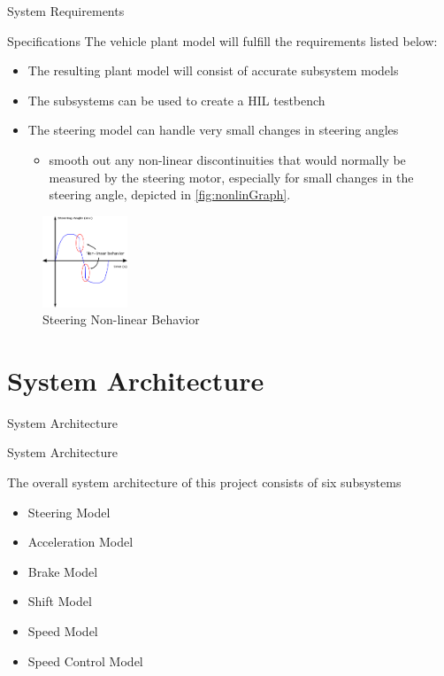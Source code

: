 \documentclass{beamer}
\begin{document}
\begin{frame}{System Requirements}
  \begin{block}{Specifications}
    The vehicle plant model will fulfill the requirements listed below:
\begin{itemize}
    \item The resulting plant model will consist of accurate subsystem models
    \item The subsystems can be used to create a HIL testbench
    \item The steering model can handle very small changes in steering angles
    \begin{itemize}
    		\item smooth out any non-linear discontinuities that would normally be measured by the steering motor, especially for small changes in the steering angle, depicted in \autoref{fig:nonlinGraph}.
    \end{itemize}
\end{itemize}
\begin{figure}[h]
    \centering
    \captionsetup{justification=centering, margin=3cm}
    \includegraphics[width=1in]{figs/inkscape/nonlinearBehavior}
    \caption{Steering Non-linear Behavior}
    \label{fig:nonlinGraph}
\end{figure}
  \end{block}
\end{frame}


\section{System Architecture}

\begin{frame}{System Architecture}
  \begin{block}{System Architecture}
    \begin{large}
      The overall system architecture of this project consists of six subsystems
      \begin{itemize}
          \item Steering Model
          \item Acceleration Model
          \item Brake Model
          \item Shift Model
          \item Speed Model
          \item Speed Control Model
        \end{itemize} 
    \end{large}
  \end{block}
\end{frame}
\end{document}
